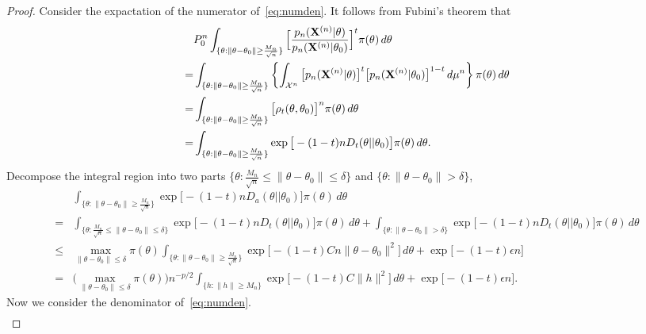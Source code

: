 \documentclass[3p]{elsarticle}
\theoremstyle{plain}
\theoremstyle{definition}
\theoremstyle{remark}
\begin{document}
\begin{proof}
    Consider the expactation of the numerator of~\ref{eq:numden}.
    It follows from Fubini's theorem that
    $$
    \begin{aligned}
        &P_0^n\int_{\{\theta:\|\theta-\theta_0\|\geq \frac{M_n}{\sqrt{n}}\} } \Big[ \frac{p_n(\BX^{(n)}|\theta)}{p_n(\BX^{(n)}|\theta_0)}  \Big]^{t} \pi(\theta) \, d \theta
        \\
        =&
        \int_{\{\theta:\|\theta-\theta_0\|\geq \frac{M_n}{\sqrt{n}}\} } \left\{\int_{\mathcal{X}^n}\big[ {p_n} (\BX^{(n)}|\theta)\big]^t \big[ p_n (\BX^{(n)}|\theta_0) \big]^{1-t} \, d\mu^n \right\} \pi(\theta) \, d \theta\\
        =&
        \int_{\{\theta:\|\theta-\theta_0\|\geq \frac{M_n}{\sqrt{n}}\} } \big[ \rho_{t}(\theta,\theta_0) \big]^n \pi(\theta) \, d \theta\\
        = &
        \int_{\{\theta:\|\theta-\theta_0\|\geq \frac{M_n}{\sqrt{n}}\} } \exp \big[-(1-t) n D_t(\theta||\theta_0) \big] \pi(\theta) \, d \theta.
    \end{aligned}
    $$
    Decompose the integral region into two parts $\{\theta:\frac{M_n}{\sqrt{n}}\leq \|\theta-\theta_0\|\leq \delta \}$ and $\{\theta: \|\theta-\theta_0\|>\delta\}$, 
    $$
    \begin{aligned}
        &\int_{\{\theta:\|\theta-\theta_0\|\geq \frac{M_n}{\sqrt{n}}\} } 
        \exp \big[ -(1-t) {n} D_a(\theta||\theta_0) \big] \pi(\theta) \, d \theta
        \\
        =&\int_{\{\theta:\frac{M_n}{\sqrt{n}}\leq \|\theta-\theta_0\|\leq \delta \}}
        \exp\big[ -(1-t) {n} D_t(\theta||\theta_0) \big] \pi(\theta) \, d \theta+
        \int_{\{\theta: \|\theta-\theta_0\|>\delta\}} \exp\big[ -(1-t) {n} D_t(\theta||\theta_0) \big] \pi(\theta) \, d \theta
        \\
        \leq &
        \max_{\|\theta-\theta_0\|\leq \delta}\pi(\theta)
        \int_{\big\{\theta: \|\theta-\theta_0\|\geq \frac{M_n}{\sqrt{n}} \big\}}
        \exp\big[ -(1-t)C {n} \|\theta-\theta_0\|^2 \big]
        \, d \theta
        +
        \exp\big[ -(1-t)\epsilon n\big]
        \\
        =&
        \big(\max_{\|\theta-\theta_0\|\leq \delta}\pi(\theta)\big)
        n^{-p/2}\int_{\big\{h: \|h\|\geq M_n \big\}} \exp\big[-(1-t)C \|h\|^2 \big] \, d \theta
        +
        \exp\big[ -(1-t)\epsilon n\big].
    \end{aligned}
    $$
    Now we consider the denominator of~\eqref{eq:numden}.
    $$
    \begin{aligned}

\end{aligned}$$
\end{proof}
\end{document}

